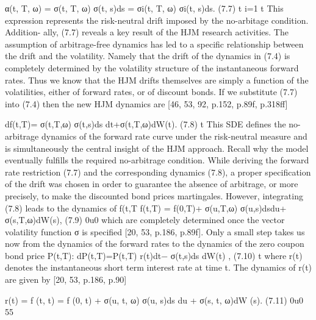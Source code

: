 α(t, T, ω) = σ(t, T, ω) σ(t, s)ds = σi(t, T, ω) σi(t, s)ds. (7.7)
t i=1 t
This expression represents the risk-neutral drift imposed by the no-arbitage condition. Addition- ally, (7.7) reveals a key result of the HJM research activities. The assumption of arbitrage-free dynamics has led to a specific relationship between the drift and the volatility. Namely that the drift of the dynamics in (7.4) is completely determined by the volatility structure of the instantaneous forward rates. Thus we know that the HJM drifts themselves are simply a function of the volatilities, either of forward rates, or of discount bonds. If we substitute (7.7) into (7.4) then the new HJM dynamics are [46, 53, 92, p.152, p.89f, p.318ff]

df(t,T)= σ(t,T,ω) σ(t,s)ds dt+σ(t,T,ω)dW(t). (7.8)
t
This SDE defines the no-arbitrage dynamics of the forward rate curve under the risk-neutral measure and is simultaneously the central insight of the HJM approach. Recall why the model eventually fulfills the required no-arbitrage condition. While deriving the forward rate restriction (7.7) and the corresponding dynamics (7.8), a proper specification of the drift was chosen in order to guarantee the absence of arbitrage, or more precisely, to make the discounted bond prices martingales. However, integrating (7.8) leads to the dynamics of f(t,T
f(t,T) = f(0,T)+ σ(u,T,ω) σ(u,s)dsdu+ σ(s,T,ω)dW(s), (7.9)
0u0
which are completely determined once the vector volatility function σ is specified [20, 53, p.186, p.89f]. Only a small step takes us now from the dynamics of the forward rates to the dynamics of the zero coupon bond price P(t,T):
dP(t,T)=P(t,T) r(t)dt− σ(t,s)ds dW(t) , (7.10)
t
where r(t) denotes the instantaneous short term interest rate at time t. The dynamics of r(t) are given by [20, 53, p.186, p.90]

r(t) = f (t, t) = f (0, t) + σ(u, t, ω) σ(u, s)ds du + σ(s, t, ω)dW (s). (7.11)
0u0
55

